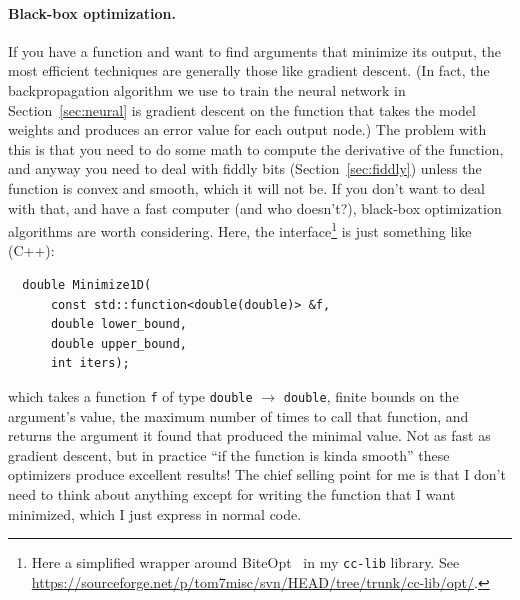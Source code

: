 \documentclass[twocolumn]{article}
\begin{document}
\paragraph{Black-box optimization.} If you have a function and want
to find arguments that minimize its output, the most efficient
techniques are generally those like gradient descent. (In fact, the
backpropagation algorithm we use to train the neural network in
Section~\ref{sec:neural} is gradient descent on the function that
takes the model weights and produces an error value for each output
node.) The problem with this is that you need to do some math to
compute the derivative of the function, and anyway you need to deal
with fiddly bits (Section~\ref{sec:fiddly}) unless the function is
convex and smooth, which it will not be. If you don't want to deal
with that, and have a fast computer (and who doesn't?), black-box
optimization algorithms are worth considering. Here, the
interface\footnote{ Here a simplified wrapper around
  BiteOpt~\cite{biteopt} in my {\tt cc-lib} library. See
  \url{https://sourceforge.net/p/tom7misc/svn/HEAD/tree/trunk/cc-lib/opt/}.}
is just something like (C++):

\begin{verbatim}
  double Minimize1D(
      const std::function<double(double)> &f,
      double lower_bound,
      double upper_bound,
      int iters);
\end{verbatim}

which takes a function \verb+f+ of type \verb+double+ $\rightarrow$
\verb+double+, finite bounds on the argument's value, the maximum
number of times to call that function, and returns the argument it
found that produced the minimal value. Not as fast as gradient
descent, but in practice ``if the function is kinda smooth'' these
optimizers produce excellent results! The chief selling point for me
is that I don't need to think about anything except for writing the
function that I want minimized, which I just express in normal code.
\end{document}
